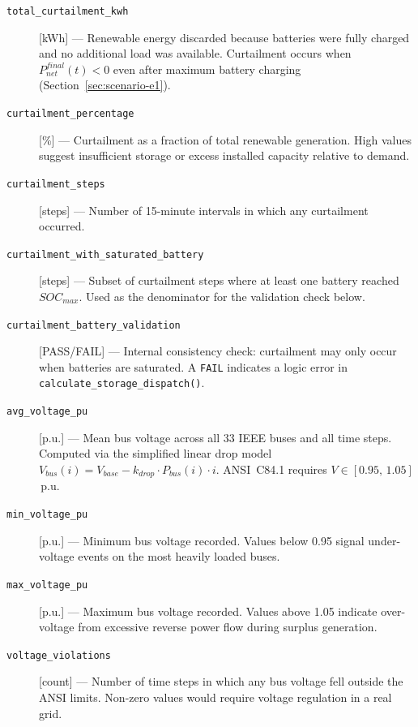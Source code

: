 \begin{description}

\item[\texttt{total\_curtailment\_kwh}] [kWh] ---
  Renewable energy discarded because batteries were fully charged and no
  additional load was available.  Curtailment occurs when
  $P_{net}^{final}(t) < 0$ even after maximum battery charging
  (Section~\ref{sec:scenario-e1}).

\item[\texttt{curtailment\_percentage}] [\%] ---
  Curtailment as a fraction of total renewable generation.  High values
  suggest insufficient storage or excess installed capacity relative to demand.

\item[\texttt{curtailment\_steps}] [steps] ---
  Number of 15-minute intervals in which any curtailment occurred.

\item[\texttt{curtailment\_with\_saturated\_battery}] [steps] ---
  Subset of curtailment steps where at least one battery reached $SOC_{max}$.
  Used as the denominator for the validation check below.

\item[\texttt{curtailment\_battery\_validation}] [PASS/FAIL] ---
  Internal consistency check: curtailment may only occur when batteries are
  saturated.  A \texttt{FAIL} indicates a logic error in
  \texttt{calculate\_storage\_dispatch()}.

\item[\texttt{avg\_voltage\_pu}] [p.u.] ---
  Mean bus voltage across all 33 IEEE buses and all time steps.  Computed via
  the simplified linear drop model
  $V_{bus}(i) = V_{base} - k_{drop} \cdot P_{bus}(i) \cdot i$.
  ANSI~C84.1 requires $V \in [0.95,\,1.05]$\,p.u.

\item[\texttt{min\_voltage\_pu}] [p.u.] ---
  Minimum bus voltage recorded.  Values below 0.95 signal under-voltage events
  on the most heavily loaded buses.

\item[\texttt{max\_voltage\_pu}] [p.u.] ---
  Maximum bus voltage recorded.  Values above 1.05 indicate over-voltage from
  excessive reverse power flow during surplus generation.

\item[\texttt{voltage\_violations}] [count] ---
  Number of time steps in which any bus voltage fell outside the ANSI limits.
  Non-zero values would require voltage regulation in a real grid.

\end{description}

